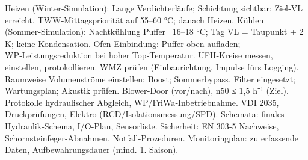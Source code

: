 \markdownRendererInterblockSeparator
{}\markdownRendererUlBeginTight
\markdownRendererUlItem Heizen (Winter‑Simulation):\markdownRendererUlItemEnd 
\markdownRendererUlItem Lange Verdichterläufe; Schichtung sichtbar; Ziel‑VL erreicht.\markdownRendererUlItemEnd 
\markdownRendererUlItem TWW‑Mittagspriorität auf 55–60 °C; danach Heizen.\markdownRendererUlItemEnd 
\markdownRendererUlItem Kühlen (Sommer‑Simulation):\markdownRendererUlItemEnd 
\markdownRendererUlItem Nachtkühlung Puffer ~16–18 °C; Tag VL = Taupunkt + 2 K; keine Kondensation.\markdownRendererUlItemEnd 
\markdownRendererUlItem Ofen‑Einbindung:\markdownRendererUlItemEnd 
\markdownRendererUlItem Puffer oben aufladen; WP‑Leistungsreduktion bei hoher Top‑Temperatur.\markdownRendererUlItemEnd 
\markdownRendererUlEndTight \markdownRendererInterblockSeparator
{}
\markdownRendererSectionEnd \markdownRendererSectionBegin
{}\markdownRendererInterblockSeparator
{}\markdownRendererUlBeginTight
\markdownRendererUlItem UFH‑Kreise messen, einstellen, protokollieren.\markdownRendererUlItemEnd 
\markdownRendererUlItem WMZ prüfen (Einbaurichtung, Impulse fürs Logging).\markdownRendererUlItemEnd 
\markdownRendererUlEndTight \markdownRendererInterblockSeparator
{}
\markdownRendererSectionEnd \markdownRendererSectionBegin
{}\markdownRendererInterblockSeparator
{}\markdownRendererUlBeginTight
\markdownRendererUlItem Raumweise Volumenströme einstellen; Boost; Sommerbypass.\markdownRendererUlItemEnd 
\markdownRendererUlItem Filter eingesetzt; Wartungsplan; Akustik prüfen.\markdownRendererUlItemEnd 
\markdownRendererUlEndTight \markdownRendererInterblockSeparator
{}
\markdownRendererSectionEnd \markdownRendererSectionBegin
{}\markdownRendererInterblockSeparator
{}\markdownRendererUlBeginTight
\markdownRendererUlItem Blower‑Door (vor/nach), n50 ≤ 1,5 h⁻¹ (Ziel).\markdownRendererUlItemEnd 
\markdownRendererUlItem Protokolle hydraulischer Abgleich, WP/FriWa‑Inbetriebnahme.\markdownRendererUlItemEnd 
\markdownRendererUlItem VDI 2035, Druckprüfungen, Elektro (RCD/Isolationsmessung/SPD).\markdownRendererUlItemEnd 
\markdownRendererUlItem Schemata: finales Hydraulik‑Schema, I/O‑Plan, Sensorliste.\markdownRendererUlItemEnd 
\markdownRendererUlItem Sicherheit: EN 303‑5 Nachweise, Schornsteinfeger‑Abnahmen, Notfall‑Prozeduren.\markdownRendererUlItemEnd 
\markdownRendererUlItem Monitoringplan: zu erfassende Daten, Aufbewahrungsdauer (mind. 1. Saison).\markdownRendererUlItemEnd 
\markdownRendererUlEndTight 
\markdownRendererSectionEnd 
\markdownRendererSectionEnd \markdownRendererDocumentEnd